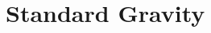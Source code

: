 \documentclass[10pt,letterpaper]{article}
\begin{document}

\section*{Standard Gravity}
\end{document}
